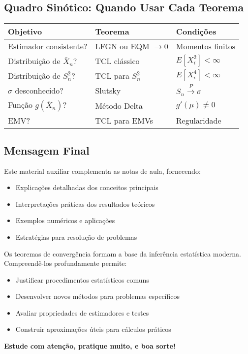 \documentclass[12pt,a4paper]{article}
\theoremstyle{definition}
\theoremstyle{plain}
\begin{document}
\subsection{Quadro Sinótico: Quando Usar Cada Teorema}

\begin{center}
\begin{tabular}{|l|l|l|}
\hline
\textbf{Objetivo} & \textbf{Teorema} & \textbf{Condições} \\
\hline
Estimador consistente? & LFGN ou EQM $\to 0$ & Momentos finitos \\
\hline
Distribuição de $\bar{X}_n$? & TCL clássico & $E[X_i^2] < \infty$ \\
\hline
Distribuição de $S_n^2$? & TCL para $S_n^2$ & $E[X_i^4] < \infty$ \\
\hline
$\sigma$ desconhecido? & Slutsky & $S_n \xrightarrow{P} \sigma$ \\
\hline
Função $g(\bar{X}_n)$? & Método Delta & $g'(\mu) \neq 0$ \\
\hline
EMV? & TCL para EMVs & Regularidade \\
\hline
\end{tabular}
\end{center}

\subsection{Mensagem Final}

Este material auxiliar complementa as notas de aula, fornecendo:
\begin{itemize}
    \item Explicações detalhadas dos conceitos principais
    \item Interpretações práticas dos resultados teóricos
    \item Exemplos numéricos e aplicações
    \item Estratégias para resolução de problemas
\end{itemize}

Os teoremas de convergência formam a base da inferência estatística moderna. Compreendê-los profundamente permite:
\begin{itemize}
    \item Justificar procedimentos estatísticos comuns
    \item Desenvolver novos métodos para problemas específicos
    \item Avaliar propriedades de estimadores e testes
    \item Construir aproximações úteis para cálculos práticos
\end{itemize}

\textbf{Estude com atenção, pratique muito, e boa sorte!}
\end{document}
